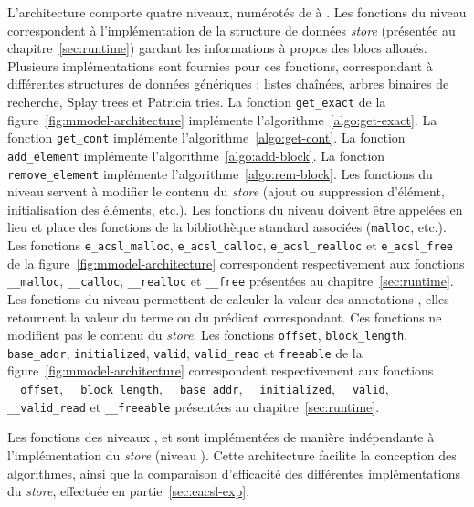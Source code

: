 L'architecture comporte quatre niveaux, numérotés de  à .
Les fonctions du niveau  correspondent à l'implémentation de la
structure de données {\em store} (présentée au chapitre~\ref{sec:runtime})
gardant les informations à propos des blocs alloués.
Plusieurs implémentations sont fournies pour ces fonctions, correspondant à
différentes structures de données génériques : listes chaînées, arbres binaires
de recherche, Splay trees et Patricia tries.
La fonction \lstinline'get_exact' de la figure~\ref{fig:mmodel-architecture}
implémente l'algorithme~\ref{algo:get-exact}.
La fonction \lstinline'get_cont' implémente l'algorithme~\ref{algo:get-cont}.
La fonction \lstinline'add_element' implémente
l'algorithme~\ref{algo:add-block}.
La fonction \lstinline'remove_element' implémente
l'algorithme~\ref{algo:rem-block}.
Les fonctions du niveau  servent à modifier le contenu du {\em store}
(ajout ou suppression d'élément, initialisation des éléments, etc.).
Les fonctions du niveau  doivent être appelées en lieu et place des
fonctions de la bibliothèque standard associées (\lstinline'malloc', etc.).
Les fonctions \lstinline'e_acsl_malloc', \lstinline'e_acsl_calloc',
\lstinline'e_acsl_realloc' et \lstinline'e_acsl_free' de la
figure~\ref{fig:mmodel-architecture} correspondent respectivement aux fonctions
\lstinline'__malloc', \lstinline'__calloc',
\lstinline'__realloc' et \lstinline'__free' présentées au
chapitre~\ref{sec:runtime}.
Les fonctions du niveau  permettent de calculer la valeur des
annotations \eacsl, elles retournent la valeur du terme ou du prédicat \eacsl
correspondant.
Ces fonctions ne modifient pas le contenu du {\em store}.
Les fonctions \lstinline'offset', \lstinline'block_length',
\lstinline'base_addr', \lstinline'initialized', \lstinline'valid',
\lstinline'valid_read' et \lstinline'freeable' de la
figure~\ref{fig:mmodel-architecture} correspondent respectivement aux fonctions
\lstinline'__offset', \lstinline'__block_length',
\lstinline'__base_addr', \lstinline'__initialized', \lstinline'__valid',
\lstinline'__valid_read' et \lstinline'__freeable' présentées au
chapitre~\ref{sec:runtime}.

Les fonctions des niveaux ,  et  sont
implémentées de manière indépendante à l'implémentation du {\em store} (niveau
).
Cette architecture facilite la conception des algorithmes, ainsi que la
comparaison d'efficacité des différentes implémentations du {\em store},
effectuée en partie~\ref{sec:eacsl-exp}.


